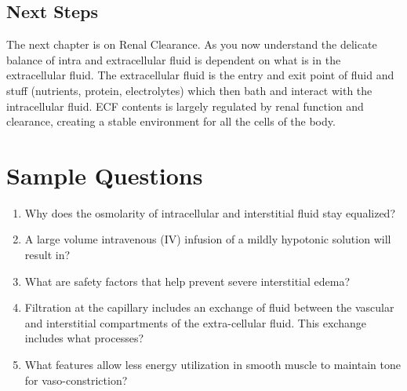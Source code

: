 \subsection{Next Steps}

The next chapter is on Renal Clearance. As you now understand the delicate balance of intra and extracellular fluid is dependent on what is in the extracellular fluid. The extracellular fluid is the entry and exit point of fluid and stuff (nutrients, protein, electrolytes) which then bath and interact with the intracellular fluid. ECF contents is largely regulated by renal function and clearance, creating a stable environment for all the cells of the body. 


\printbibliography[heading=subbibintoc]

\section*{Sample Questions}

\begin{enumerate}
    \item Why does the osmolarity of intracellular and interstitial fluid stay equalized?
    \item A large volume intravenous (IV) infusion of a mildly hypotonic solution will result in?
    \item What are safety factors that help prevent severe interstitial edema?
    \item Filtration at the capillary includes an exchange of fluid between the vascular and interstitial compartments of the extra-cellular fluid. This exchange includes what processes?
    \item What features allow less energy utilization in smooth muscle to maintain tone for vaso-constriction?
\end{enumerate} 
